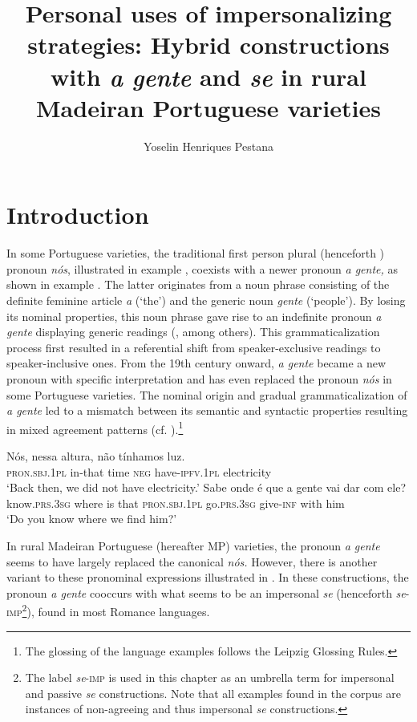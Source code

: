 \documentclass[output=paper]{langscibook}
\author{Yoselin {Henriques Pestana}\orcid{}\affiliation{Universität Zürich}}
\title[Personal uses of impersonalizing strategies]{Personal uses of impersonalizing strategies: Hybrid constructions with \textit{a gente} and \textit{se} in rural Madeiran Portuguese varieties}
\begin{document}
\AffiliationsWithoutIndexing{}
\maketitle

\section{Introduction}

In some Portuguese varieties, the traditional first person plural (henceforth ) pronoun \textit{nós}, illustrated in example , coexists with a newer  pronoun \textit{a gente,} as shown in example . The latter originates from a noun phrase consisting of the definite feminine article \textit{a} (‘the’) and the generic noun \textit{gente} (‘people’). By losing its nominal properties, this noun phrase gave rise to an indefinite pronoun \textit{a gente} displaying generic readings (\citealt{Lopes2007,Lopes2003,Lopes1999, deOmena2003}, among others). This grammaticalization process first resulted in a referential shift from speaker-exclusive readings to speaker-inclusive ones. From the 19th century onward, \textit{a gente} became a new  pronoun with specific interpretation and has even replaced the pronoun \textit{nós} in some Portuguese varieties. The nominal origin and gradual grammaticalization of \textit{a gente} led to a mismatch between its semantic and syntactic properties resulting in mixed agreement patterns (cf. ).\footnote{The glossing of the language examples follows the Leipzig Glossing Rules.}

\ea\label{ex:henriques:1}
 \gll Nós, nessa altura, não tínhamos luz. \\
      \textsc{pron.sbj.1pl} in-that time \textsc{neg} have-\textsc{ipfv.1pl} electricity \\
 \glt ‘Back then, we did not have electricity.’
\ex\label{ex:henriques:2}
 \gll Sabe onde é que {a gente} vai dar com ele?\\ 
      know.\textsc{prs.3sg} where is that \textsc{pron.sbj.1pl} go.\textsc{prs.3sg} give-\textsc{inf} with him\\ 
  \glt `Do you know where we find him?'
\z
 

In rural Madeiran Portuguese (hereafter MP) varieties, the  pronoun \textit{a gente} seems to have largely replaced the canonical \textit{nós.} However, there is another variant to these pronominal  expressions illustrated in . In these constructions, the  pronoun \textit{a gente} cooccurs with what seems to be an impersonal \textit{se} (henceforth \textit{se}-\textsc{imp}\footnote{The label \textit{se}-\textsc{imp} is used in this chapter as an umbrella term for impersonal and passive \textit{se} constructions. Note that all examples found in the corpus are instances of non-agreeing and thus impersonal \textit{se} constructions.}), found in most Romance languages.
\end{document}
